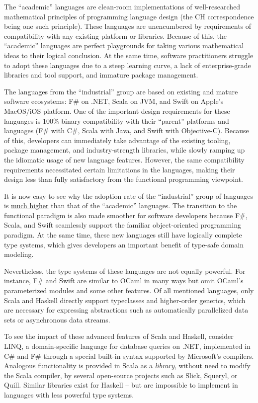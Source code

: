 The ``academic'' languages are clean-room implementations of well-researched
mathematical principles of programming language design (the CH correspondence
being one such principle). These languages are unencumbered by requirements
of compatibility with any existing platform or libraries. Because
of this, the ``academic'' languages are perfect playgrounds for
taking various mathematical ideas to their logical conclusion. At
the same time, software practitioners struggle to adopt these languages
due to a steep learning curve, a lack of enterprise-grade libraries
and tool support, and immature package management.

The languages from the ``industrial'' group are based on existing
and mature software ecosystems: F\# on .NET, Scala on JVM, and Swift
on Apple's MacOS/iOS platform. One of the important design requirements
for these languages is 100\% binary compatibility with their ``parent''
platforms and languages (F\# with C\#, Scala with Java, and Swift
with Objective-C). Because of this, developers can immediately take
advantage of the existing tooling, package management, and industry-strength
libraries, while slowly ramping up the idiomatic usage of new language
features. However, the same compatibility requirements necessitated
certain limitations in the languages, making their design less than
fully satisfactory from the functional programming viewpoint.

It is now easy to see why the adoption rate of the ``industrial''
group of languages is \href{https://www.tiobe.com/tiobe-index/}{much higher}
than that of the ``academic'' languages. The transition to the functional
paradigm is also made smoother for software developers because F\#,
Scala, and Swift seamlessly support the familiar object-oriented programming
paradigm. At the same time, these new languages still have logically
complete type systems, which gives developers an important benefit
of type-safe domain modeling.

Nevertheless, the type systems of these languages are not equally
powerful. For instance, F\# and Swift are similar to OCaml in many
ways but omit OCaml's parameterized modules and some other features.
Of all mentioned languages, only Scala and Haskell directly support
typeclasses and higher-order generics, which are necessary for expressing
abstractions such as automatically parallelized data sets or asynchronous
data streams.

To see the impact of these advanced features of Scala and Haskell,
consider LINQ, a domain-specific language for database queries on
.NET, implemented in C\# and F\# through a special built-in syntax
supported by Microsoft's compilers. Analogous functionality is provided
in Scala as a \emph{library}, without need to modify the Scala compiler,
by several open-source projects such as Slick, Squeryl, or Quill.
Similar libraries exist for Haskell – but are impossible to implement
in languages with less powerful type systems.

